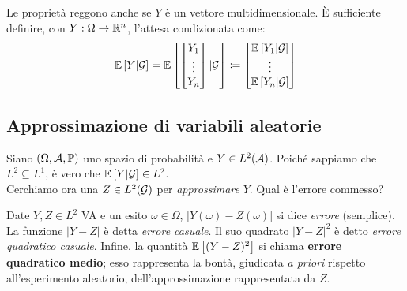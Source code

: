 \begin{nb}
  Le proprietà reggono anche se $Y$ è un vettore multidimensionale.
  È sufficiente definire, con $Y: \Omega \to \mathbb R^n$, l'attesa condizionata come:
  $$\mathbb E \left[ Y|\mathcal G \right] = \mathbb E \left[  \begin{bmatrix} Y_1 \\ \vdots \\ Y_n \end{bmatrix} | \mathcal G \right] \coloneqq \begin{bmatrix} \mathbb E \left[ Y_1 | \mathcal G \right] \\ \vdots \\ \mathbb E \left[ Y_n | \mathcal G \right] \end{bmatrix}$$
\end{nb}

\subsection{Approssimazione di variabili aleatorie}

Siano $(\Omega, \mathcal A, \mathbb P)$ uno spazio di probabilità e $Y \in L^2(\mathcal A)$. Poiché sappiamo che $L^2 \subseteq L^1$, è vero che $\mathbb E \left[ Y|\mathcal G \right] \in L^2$. \\
Cerchiamo ora una $Z \in L^2(\mathcal G)$ per \emph{approssimare} $Y$. Qual è l'errore commesso?\\[-8pt]
\begin{defn}
  Date $Y, Z \in L^2$ VA e un esito $\omega \in \Omega$, $|Y(\omega)-Z(\omega)|$ si dice \textit{errore} (semplice). La funzione $|Y-Z|$ è detta \textit{errore casuale}. Il suo quadrato $|Y-Z|^2$ è detto \textit{errore quadratico casuale}. Infine, la quantità $\mathbb E \left[ (Y-Z)^2 \right]$ si chiama \textbf{errore quadratico medio}; esso rappresenta la bontà, giudicata \emph{a priori} rispetto all'esperimento aleatorio, dell'approssimazione rappresentata da $Z$.
\end{defn}

